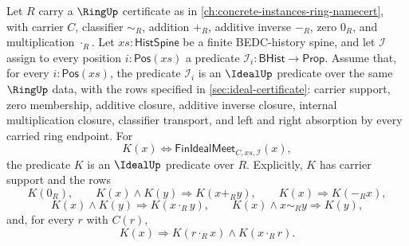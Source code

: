 \begin{theorem}
\label{thm:finite-ideal-intersection-closure}
Let $R$ carry a $\RingUp$ certificate as in \autoref{ch:concrete-instances-ring-namecert}, with carrier $C$, classifier $\sim_R$, addition $+_R$, additive inverse $-_R$, zero $0_R$, and multiplication $\cdot_R$. Let $xs:\mathsf{HistSpine}$ be a finite BEDC-history spine, and let $\mathcal{I}$ assign to every position $i:\mathsf{Pos}(xs)$ a predicate $\mathcal{I}_i:\mathsf{BHist}\to\mathsf{Prop}$. Assume that, for every $i:\mathsf{Pos}(xs)$, the predicate $\mathcal{I}_i$ is an $\IdealUp$ predicate over the same $\RingUp$ data, with the rows specified in \autoref{sec:ideal-certificate}: carrier support, zero membership, additive closure, additive inverse closure, internal multiplication closure, classifier transport, and left and right absorption by every carried ring endpoint. For
$$
K(x)\Longleftrightarrow \mathsf{FinIdealMeet}_{C,xs,\mathcal{I}}(x),
$$
the predicate $K$ is an $\IdealUp$ predicate over $R$. Explicitly, $K$ has carrier support and the rows
$$
K(0_R),\qquad
K(x)\land K(y)\Longrightarrow K(x+_R y),\qquad
K(x)\Longrightarrow K(-_R x),
$$
$$
K(x)\land K(y)\Longrightarrow K(x\cdot_R y),\qquad
K(x)\land x\sim_R y\Longrightarrow K(y),
$$
and, for every $r$ with $C(r)$,
$$
K(x)\Longrightarrow K(r\cdot_R x)\land K(x\cdot_R r).
$$
\end{theorem}

